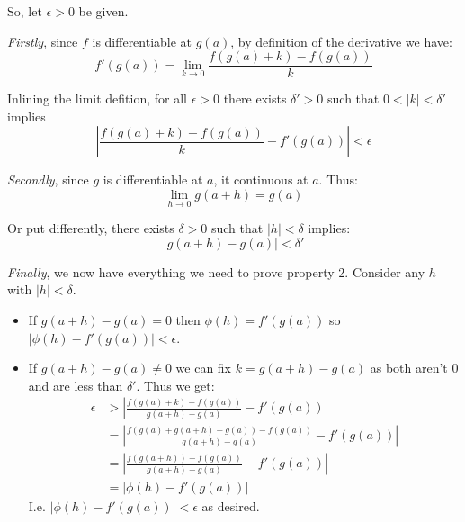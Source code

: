 So, let $\epsilon>0$ be given.

\vs

\textit{Firstly}, since $f$ is differentiable at $g(a)$, by definition
of the derivative we have:
\[f'(g(a))=\lim_{k\to0}\frac{f(g(a)+k)-f(g(a))}{k}\]

Inlining the limit defition, for all $\epsilon>0$ there exists
$\delta'>0$ such that $0<|k|<\delta'$ implies
\[\left|\frac{f(g(a)+k)-f(g(a))}{k}-f'(g(a))\right|<\epsilon\]

\textit{Secondly}, since $g$ is differentiable at $a$, it continuous
at $a$. Thus:
\[\lim_{h\to0}g(a+h)=g(a)\]

Or put differently, there exists $\delta>0$ such that $|h|<\delta$ implies:
\[|g(a+h)-g(a)|<\delta'\]

\textit{Finally}, we now have everything we need to prove property 2.
Consider any $h$ with $|h|<\delta$.
\begin{itemize}
\item If $g(a+h)-g(a)=0$ then $\phi(h)=f'(g(a))$ so $|\phi(h)-f'(g(a))|<\epsilon$.
\item If $g(a+h)-g(a)\neq0$ we can fix $k=g(a+h)-g(a)$ as both aren't
  $0$ and are less than $\delta'$. Thus we get:
\begin{align*}
  \epsilon&>\left|\frac{f(g(a)+k)-f(g(a))}{g(a+h)-g(a)}-f'(g(a))\right|\\
  &=\left|\frac{f(g(a)+g(a+h)-g(a))-f(g(a))}{g(a+h)-g(a)}-f'(g(a))\right|\\
  &=\left|\frac{f(g(a+h))-f(g(a))}{g(a+h)-g(a)}-f'(g(a))\right|\\
  &=\left|\phi(h)-f'(g(a))\right|
\end{align*}
I.e. $\left|\phi(h)-f'(g(a))\right|<\epsilon$ as desired.
\end{itemize}

